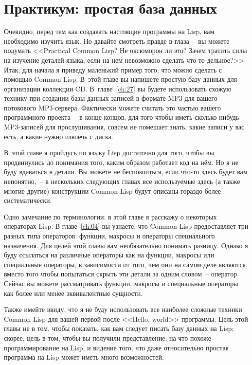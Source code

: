 \chapter{Практикум: простая база данных}
\label{ch:03}

\thispagestyle{empty}

Очевидно, перед тем как создавать настоящие программы на Lisp, вам необходимо изучить
язык. Но давайте смотреть правде в глаза~-- вы можете подумать <<Practical Common Lisp?
Не оксюморон ли это? Зачем тратить силы на изучение деталей языка, если на нем невозможно
сделать что-то дельное?>> Итак, для начала я приведу маленький пример того, что можно
сделать с помощью Common Lisp. В~этой главе вы напишете простую базу данных для
организации коллекции CD. В~главе~\ref{ch:27} вы будете использовать схожую технику при создании
базы данных записей в формате MP3 для вашего потокового MP3-сервера. Фактически можете
считать это частью вашего программного проекта~-- в конце концов, для того чтобы иметь
сколько-нибудь MP3-записей для прослушивания, совсем не помешает знать, какие записи у вас
есть, а какие нужно извлечь с диска.

В~этой главе я пройдусь по языку Lisp достаточно для того, чтобы вы продвинулись до
понимания того, каким образом работает код на нём. Но я не буду вдаваться в детали. Вы
можете не беспокоиться, если что-то здесь будет вам непонятно,~-- в нескольких следующих
главах все используемые здесь (а также многие другие) конструкции Common Lisp будут
описаны гораздо более систематически.

Одно замечание по терминологии: в этой главе я расскажу о некоторых операторах Lisp. В
главе~\ref{ch:04} вы узнаете, что Common Lisp предоставляет три разных типа операторов: функции,
макросы и операторы специального назначения. Для целей этой главы вам необязательно
понимать разницу. Однако я буду ссылаться на различные операторы как на функции, макросы
или специальные операторы, в зависимости от того, чем они на самом деле являются, вместо
того чтобы попытаться скрыть эти детали за одним словом~-- оператор. Сейчас вы можете
рассматривать функции, макросы и специальные операторы как более или менее эквивалентные
сущности.

Также имейте ввиду, что я не буду использовать все наиболее сложные техники Common Lisp
для вашей первой после <<Hello, world>> программы. Цель этой главы не в том, чтобы показать,
как вам следует писать базу данных на Lisp; скорее, цель в том, чтобы вы получили
представление, на что похоже программирование на Lisp, и видение того, что даже
относительно простая программа на Lisp может иметь много возможностей.

